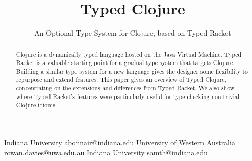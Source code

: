 \documentclass[preprint,9pt]{sigplanconf}
\begin{document}
\setlength{\pdfpageheight}{\paperheight}
\setlength{\pdfpagewidth}{\paperwidth}






\title{Typed Clojure}
\subtitle{An Optional Type System for Clojure, based on Typed Racket}

           {Indiana University}
           {abonnair@indiana.edu}
           {University of Western Australia}
           {rowan.davies@uwa.edu.au}
           {Indiana University}
           {samth@indiana.edu}

\maketitle

\begin{abstract}
Clojure is a dynamically typed language hosted on the Java 
Virtual Machine.
Typed Racket is a valuable starting point for
a gradual type system that targets Clojure.
Building a similar type system for a new language gives the
designer some flexibility to repurpose and extend features.
This paper gives an overview of Typed Clojure, concentrating
on the extensions and differences from Typed Racket. We also
show where Typed Racket's features were particularly useful
for type checking non-trivial Clojure idioms.
\end{abstract}


\end{document}
